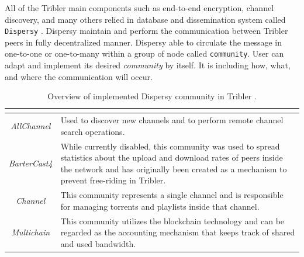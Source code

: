 All of the Tribler main components such as end-to-end encryption, channel discovery, and many others relied in database and dissemination system called \texttt{Dispersy} \cite{2013:dispersy:zeilemaker}. Dispersy maintain and perform the communication between Tribler peers in fully decentralized manner. Dispersy able to circulate the message in one-to-one or one-to-many within a group of node called \texttt{community}. User can adapt and implement its desired \textit{community} by itself. It is including how, what, and where the communication will occur.

\begin{table}[tbp]
	\centering
	\caption{Overview of implemented Dispersy community in Tribler \cite{2016:tribler-techdebt:vos}.}
	\label{tbl:community}
	\begin{tabular}{|c|p{11cm}|}
		\hline
		\rowcolor[HTML]{EFEFEF} 
		\multicolumn{1}{|c|}{\cellcolor[HTML]{EFEFEF}{\color[HTML]{333333} \textbf{Community Name}}} & \multicolumn{1}{c|}{\cellcolor[HTML]{EFEFEF}{\color[HTML]{333333} \textbf{Purpose}}}                                                                                                                                     \\ \hline
		\textit{AllChannel}                                                                          & Used to discover new channels and to perform remote channel search operations.                                                                                                                                           \\ \hline
		\textit{BarterCast4}                                                                         & While currently disabled, this community was used to spread statistics about the upload and download rates of peers inside the network and has originally been created as a mechanism to prevent free-riding in Tribler. \\ \hline
		\textit{Channel}                                                                             & This community represents a single channel and is responsible for managing torrents and playlists inside that channel.                                                                                                   \\ \hline
		\textit{Multichain}                                                                          & This community utilizes the blockchain technology and can be regarded as the accounting mechanism that keeps track of shared and used bandwidth.                                                                         \\ \hline

\end{tabular}
\end{table}
